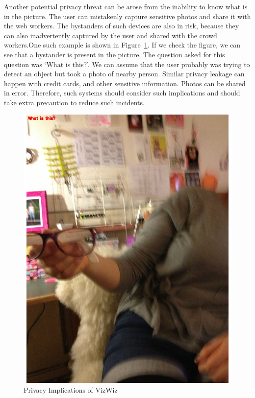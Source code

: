 \documentclass[sigconf]{acmart}
\begin{document}
Another potential privacy threat can be arose from the inability to know what is in the picture. The user can mistakenly capture sensitive photos and share it with the web workers. The bystanders of such devices are also in risk, because they can also inadvertently captured by the user and shared with the crowd workers.One such example is shown in Figure~\ref{fig:privacy}. If we check the figure, we can see that a bystander is present in the picture. The question asked for this question was `What is this?'. We can assume that the user probably was trying to detect an object but took a photo of nearby person. Similar privacy leakage can happen with credit cards, and other sensitive information. Photos can be shared in error. Therefore, such systems should consider such implications and should take extra precaution to reduce such incidents. 
\begin{figure}[tbp]
        \centering
        
        \includegraphics[width=\columnwidth]{images/private_1.pdf}  
        \caption{Privacy Implications of VizWiz} 
          \label{fig:privacy}   
      
        
\end{figure}
\end{document}
